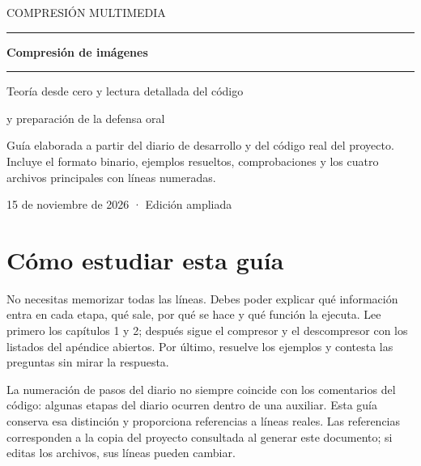 \documentclass[11pt,a4paper,oneside]{report}
\begin{document}
\begin{titlepage}
\vspace*{12mm}
{\large COMPRESIÓN MULTIMEDIA\par}
\vspace{4mm}{\large Práctica 4 · Ejercicio 2\par}
\vspace{17mm}\hrule\vspace{9mm}
{\Huge\bfseries Compresión de imágenes\par}
\vspace{3mm}{\huge con Huffman a medida\par}
\vspace{9mm}\hrule
{}
\vspace{10mm}
{\large Teoría desde cero y lectura detallada del código\par
y preparación de la defensa oral\par}
\vfill
\begin{minipage}{0.9\textwidth}
Guía elaborada a partir del diario de desarrollo y del código
real del proyecto. Incluye el formato binario, ejemplos resueltos,
comprobaciones y los cuatro archivos principales con líneas numeradas.
\end{minipage}
\vspace{13mm}\par
15 de noviembre de 2026 · Edición ampliada
\end{titlepage}
\chapter*{Cómo estudiar esta guía}
No necesitas memorizar todas las líneas. Debes poder explicar qué información
entra en cada etapa, qué sale, por qué se hace y qué función la ejecuta.
Lee primero los capítulos 1 y 2; después sigue el compresor y el descompresor
con los listados del apéndice abiertos. Por último, resuelve los ejemplos y
contesta las preguntas sin mirar la respuesta.

La numeración de pasos del diario no siempre coincide con los comentarios
del código: algunas etapas del diario ocurren dentro de una auxiliar.
Esta guía conserva esa distinción y proporciona referencias a líneas reales.
Las referencias corresponden a la copia del proyecto consultada al generar
este documento; si editas los archivos, sus líneas pueden cambiar.
\end{document}
